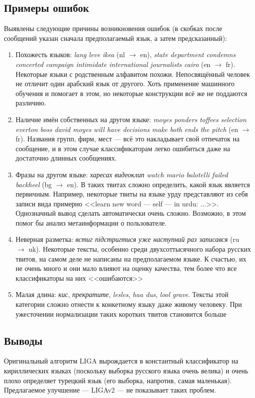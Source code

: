 \documentclass[a4paper, 14pt]{article}
\begin{document}
		\subsection{Примеры ошибок}
		Выявлены следующие причины возникновения ошибок (в скобках после сообщений указан сначала предполагаемый язык, а затем предсказанный):
		\begin{enumerate}
			\item Похожесть языков: \textit{lang leve ikea} (nl $\to$ en), 
				\textit{state department condemns concerted campaign intimidate international journalists cairo} (en $\to$ fr).
				Некоторые языки с родственным алфавитом похожи. Непосвящённый человек не отличит один арабский язык от другого. Хоть применение
				машинного обучения и помогает в этом, но некоторые конструкции всё же не поддаются различию.
			\item Наличие имён собственных на другом языке:
				\textit{moyes ponders toffees selection everton boss david moyes will have decisions make both ends the pitch} (en $\to$ fr).
				Названия групп, фирм, мест --- всё это накладывает свой отпечаток на сообщение, и в этом случае классификаторам
				легко ошибиться даже на достаточно длинных сообщениях.
			\item Фразы на другом языке:
				\textit{харесах видеоклип watch mario balotelli failed backheel} (bg $\to$ en). В таких твитах сложно определить, какой
				язык является первичным. Например, некоторые твиты на языке урду представляют из себя записи вида примерно 
				<<learn new word --- self --- in urdu: ...>>. Однозначный вывод сделать автоматически очень сложно. Возможно, в этом
				помог бы анализ метаинформации о пользователе.
			\item Неверная разметка: 
				\textit{встиг підстригтися уже наступний раз записався} (ru $\to$ uk). Некоторые тексты, особенно среди двухсоттысячного набора 
				русских твитов, на самом деле не написаны на предполагаемом языке. К счастью, их не очень много и они мало влияют на оценку
				качества, тем более что все классификаторы на них <<ошибаются>>
			\item Малая длина:
				\textit{кис}, \textit{прекратите}, \textit{lesles}, \textit{haa dus}, \textit{lool grave}. Тексты этой категории сложно отнести
				к конкетному языку даже живому человеку. При ужесточении нормализации таких коротких твитов становится больше
		\end{enumerate}
	
		\subsection{Выводы}
		Оригинальный алгоритм LIGA вырождается в константный классификатор на кириллических языках (поскольку выборка русского языка очень велика) и 
		очень плохо определяет турецкий язык (его выборка, напротив, самая маленькая). Предлагаемое улучшение --- LIGAv2 --- не показывает таких проблем.
		
\end{document}
